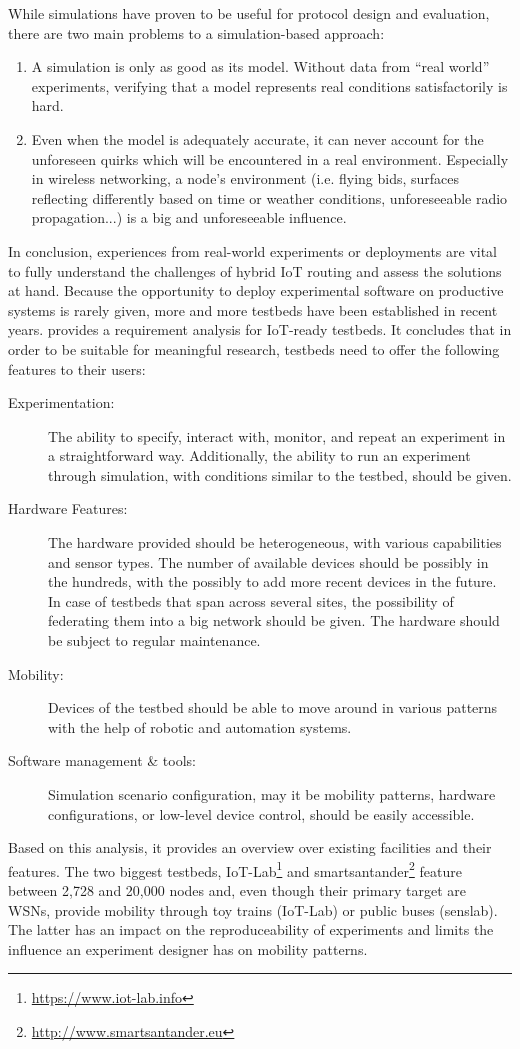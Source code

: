 \documentclass[a4paper,10pt]{scrartcl}
\begin{document}
While simulations have proven to be useful for protocol design and evaluation, there are two main problems to a simulation-based approach: 
\begin{enumerate}
\item A simulation is only as good as its model. Without data from ``real world'' experiments, verifying that a model represents real conditions satisfactorily is hard.
\item Even when the model is adequately accurate, it can never account for the unforeseen quirks which will be encountered in a real environment. Especially in wireless networking, a node's environment (i.e. flying bids, surfaces reflecting differently based on time or weather conditions, unforeseeable radio propagation...) is a big and unforeseeable influence.
\end{enumerate}
In conclusion, experiences from real-world experiments or deployments are vital to fully understand the challenges of hybrid IoT routing and assess the solutions at hand. Because the opportunity to deploy experimental software on productive systems is rarely given, more and more testbeds have been established in recent years. \cite{testbed-survey} provides a requirement analysis for IoT-ready testbeds. It concludes that in order to be suitable for meaningful research, testbeds need to offer the following features to their users:
\begin{description}
\item[Experimentation:] The ability to specify, interact with, monitor, and repeat an experiment in a straightforward way. Additionally, the ability to run an experiment through simulation, with conditions similar to the testbed, should be given.  
\item[Hardware Features:] The hardware provided should be heterogeneous, with various capabilities and sensor types. The number of available devices should be possibly in the hundreds, with the possibly to add more recent devices in the future. In case of testbeds that span across several sites, the possibility of federating them into a big network should be given. The hardware should be subject to regular maintenance.
\item[Mobility:] Devices of the testbed should be able to move around in various patterns with the help of robotic and automation systems.
\item[Software management \& tools:] Simulation scenario configuration, may it be mobility patterns, hardware configurations, or low-level device control, should be easily accessible.
\end{description}
Based on this analysis, it provides an overview over existing facilities and their features. The two biggest testbeds, IoT-Lab\footnote{\url{https://www.iot-lab.info}} and smartsantander\footnote{\url{http://www.smartsantander.eu}} feature between 2,728 and 20,000 nodes and, even though their primary target are \glspl{WSN}, provide mobility through toy trains (IoT-Lab) or public buses (senslab). The latter has an impact on the reproduceability of experiments and limits the influence an experiment designer has on mobility patterns.
\end{document}
